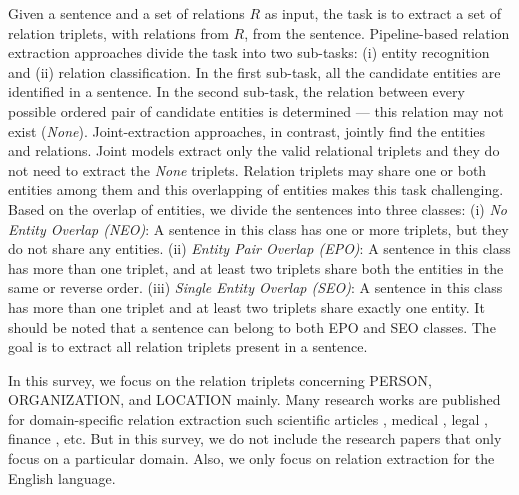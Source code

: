 Given a sentence and a set of relations $R$ as input, the task is to extract a set of relation triplets, with relations from $R$, from the sentence. Pipeline-based relation extraction approaches divide the task into two sub-tasks: (i) entity recognition and (ii) relation classification. In the first sub-task, all the candidate entities are identified in a sentence. In the second sub-task, the relation between every possible ordered pair of candidate entities is determined --- this relation may not exist ({\em None}). 
Joint-extraction approaches, in contrast, jointly find the entities and relations. Joint models extract only the valid relational triplets and they do not need to extract the {\em None} triplets. Relation triplets may share one or both entities among them and this overlapping of entities makes this task challenging. Based on the overlap of entities, we divide the sentences into three classes: (i) {\em No Entity Overlap (NEO)}: A sentence in this class has one or more triplets, but they do not share any entities. (ii) {\em Entity Pair Overlap (EPO)}: A sentence in this class has more than one triplet, and at least two triplets share both the entities in the same or reverse order. (iii) {\em Single Entity Overlap (SEO)}: A sentence in this class has more than one triplet and at least two triplets share exactly one entity. It should be noted that a sentence can belong to both EPO and SEO classes. The goal is to extract all relation triplets present in a sentence.

In this survey, we focus on the relation triplets concerning PERSON, ORGANIZATION, and LOCATION mainly. Many research works are published for domain-specific relation extraction such scientific articles , medical , legal , finance , etc. But in this survey, we do not include the research papers that only focus on a particular domain. Also, we only focus on relation extraction for the English language.

